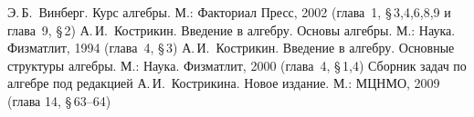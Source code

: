 \documentclass[a4paper,10pt]{amsart}
\theoremstyle{definition}
\theoremstyle{remark}
\begin{document}
%

\bigskip

\begin{thebibliography}{99}
Э.\,Б.~Винберг. Курс алгебры. М.: Факториал Пресс, 2002 (глава~1,
\S\,3,4,6,8,9 и глава~9, \S\,2)
А.\,И.~Кострикин. Введение в алгебру. Основы алгебры. М.: Наука.
Физматлит, 1994 (глава~4, \S\,3)
А.\,И.~Кострикин. Введение в алгебру. Основные структуры алгебры.
М.: Наука. Физматлит, 2000 (глава~4, \S\,1,4)
Сборник задач по алгебре под редакцией А.\,И.~Кострикина. Новое
издание. М.: МЦНМО, 2009 (глава 14, \S\,63--64)
\end{thebibliography}
\end{document}
